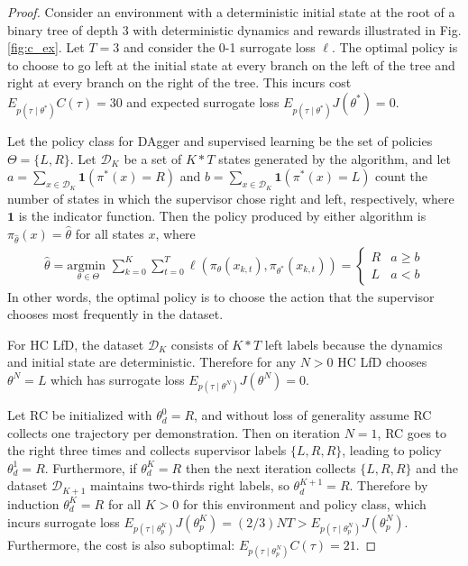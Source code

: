 \documentclass[10pt, conference]{ieeeconf}      %
\newcommand{\mD}{\mathcal{D}}
\begin{document}
\begin{proof}
Consider an environment with a deterministic initial state at the root of a binary tree of depth 3 with deterministic dynamics and rewards illustrated in Fig. \ref{fig:c_ex}.
Let $T = 3$ and consider the 0-1 surrogate loss $\ell$.
The optimal policy is to choose to go left at the initial state at every branch on the left of the tree and right at every branch on the right of the tree.
This incurs cost $E_{p(\tau \mid \theta^*)} C(\tau) = 30$ and expected surrogate loss $E_{p(\tau \mid \theta^*)} J(\theta^*) = 0$.

Let the policy class for DAgger and supervised learning be the set of policies $\Theta = \{L, R\}$.
Let $\mD_K$ be a set of $K * T$ states generated by the algorithm, and let $a = \sum_{x \in \mD_K} \mathbf{1}(\pi^*(x) = R)$ and $b = \sum_{x \in \mD_K} \mathbf{1}(\pi^*(x) = L)$ count the number of states in which the supervisor chose right and left, respectively, where $\mathbf{1}$ is the indicator function. 
Then the policy produced by either algorithm is $\pi_{\hat{\theta}}(x) = \hat{\theta}$ for all states $x$, where
\vspace{-2ex}
\begin{align*}
	\hat{\theta} = \underset{\theta \in \Theta}{\text{argmin }} \sum_{k=0}^K \sum_{t=0}^T \ell(\pi_{\theta}(x_{k,t}), \pi_{\theta^*}(x_{k,t})) = \left\{ \begin{array}{cc} R & a \geq b \\ L & a < b \end{array} \right.
\end{align*}
\noindent In other words, the optimal policy is to choose the action that the supervisor chooses most frequently in the dataset.

For HC LfD, the dataset $\mD_K$ consists of $K * T$ left labels because the dynamics and initial state are deterministic.
Therefore for any $N > 0$  HC LfD chooses $\theta^N = L$ which has surrogate loss $E_{p(\tau \mid \theta^N)} J(\theta^N) = 0$.

Let RC be initialized with $\theta_d^0 = R$, and without loss of generality assume RC collects one trajectory per demonstration.
Then on iteration $N=1$, RC goes to the right three times and collects supervisor labels $\{L, R, R\}$, leading to policy $\theta_{d}^1 = R$.
Furthermore, if $\theta_{d}^K = R$ then the next iteration collects $\{L, R, R\}$ and the dataset $\mD_{K+1}$ maintains two-thirds right labels, so $\theta_{d}^{K+1} = R$.
Therefore by induction $\theta_{d}^{K} = R$ for all $K > 0$ for this environment and policy class, which incurs surrogate loss $E_{p(\tau \mid \theta_{p}^K)} J(\theta_{p}^K) = (2 / 3) N T > E_{p(\tau \mid \theta_{p}^N)} J(\theta_{p}^N)$.
Furthermore, the cost is also suboptimal: $E_{p(\tau \mid \theta_{p}^N)} C(\tau) = 21$.
\end{proof}
\end{document}
